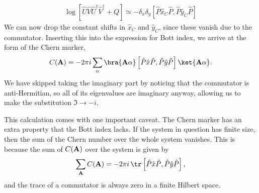 \begin{align}
	\log \left [ \hat U\hat V\hat U^\dag \hat V^\dag  + Q  \right ] \simeq - \delta_x \delta_y \left [  \hat P \hat x_C \hat P, \hat P \hat y_C \hat P  \right ]
\end{align}
We can now drop the constant shifts in $\hat x_C$ and $\hat y_C$, since these vanish due to the commutator. Inserting this into the expression for Bott index, we arrive at the form of the Chern marker,
\begin{align}
 	C(\textbf A)  = -2\pi i \sum_\alpha \bra{\textbf A \alpha} \left [  \hat P \hat x \hat P, \hat P \hat y \hat P  \right ]  \ket{\textbf A \alpha} .
\end{align}
We have skipped taking the imaginary part by noticing that the commutator is anti-Hermitian, so all of its eigenvalues are imaginary anyway, allowing us to make the substitution $\Im \rightarrow -i $.\par
This calculation comes with one important caveat. The Chern marker has an extra property that the Bott index lacks. If the system in question has finite size, then the sum of the Chern number over the whole system vanishes. This is because the sum of $C(\textbf A)$ over the system is given by
\begin{align}\label{eqn:chern_sum}
	\sum_{\textbf A} C(\textbf A) = - 2\pi i \, \tr  \left [  \hat P \hat x \hat P, \hat P \hat y \hat P  \right ] ,
\end{align}
and the trace of a commutator is always zero in a finite Hilbert space. 